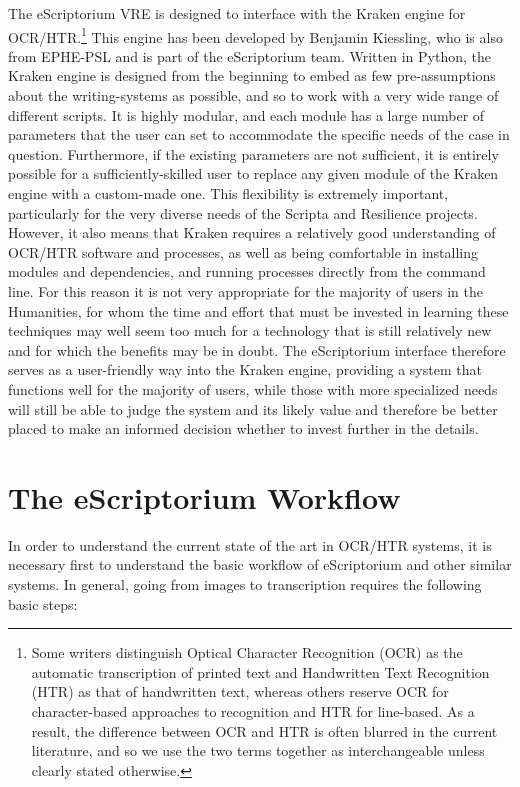 The eScriptorium VRE is designed to interface with the Kraken engine for
OCR/HTR.\footnote{Some writers distinguish Optical Character Recognition (OCR)
as the automatic transcription of printed text and Handwritten Text Recognition
(HTR) as that of handwritten text, whereas others reserve OCR for
character-based approaches to recognition and HTR for line-based. As a result,
the difference between OCR and HTR is often blurred in the current literature,
and so we use the two terms together as interchangeable unless clearly stated
otherwise.} This engine has been developed by Benjamin Kiessling, who is also
from EPHE-PSL and is part of the eScriptorium team. Written in Python, the
Kraken engine is designed from the beginning to embed as few pre-assumptions
about the writing-systems as possible, and so to work with a very wide range of
different scripts. It is highly modular, and each module has a large number of
parameters that the user can set to accommodate the specific needs of the case
in question. Furthermore, if the existing parameters are not sufficient, it is
entirely possible for a sufficiently-skilled user to replace any given module
of the Kraken engine with a custom-made one. This flexibility is extremely
important, particularly for the very diverse needs of the Scripta and
Resilience projects. However, it also means that Kraken requires a relatively
good understanding of OCR/HTR software and processes, as well as being
comfortable in installing modules and dependencies, and running processes
directly from the command line. For this reason it is not very appropriate for
the majority of users in the Humanities, for whom the time and effort that must
be invested in learning these techniques may well seem too much for a
technology that is still relatively new and for which the benefits may be in
doubt. The eScriptorium interface therefore serves as a user-friendly way into
the Kraken engine, providing a system that functions well for the majority of
users, while those with more specialized needs will still be able to judge the
system and its likely value and therefore be better placed to make an informed
decision whether to invest further in the details.

\section{The eScriptorium Workflow}

In order to understand the current state of the art in OCR/HTR systems, it is
necessary first to understand the basic workflow of eScriptorium and other
similar systems. In general, going from images to transcription requires
the following basic steps:

